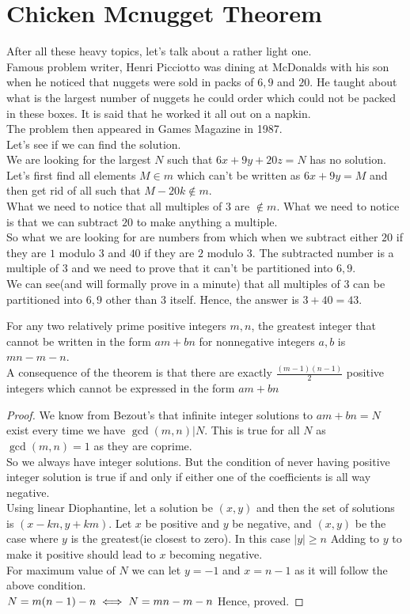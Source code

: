 \section{Chicken Mcnugget Theorem}
After all these heavy topics, let's talk about a rather light one.\\
Famous problem writer, Henri Picciotto was dining at McDonalds with his son when he noticed that nuggets were sold in packs of $6,9$ and $20$. He taught about what is the largest number of nuggets he could order which could not be packed in these boxes. It is said that he worked it all out on a napkin.\\
The problem then appeared in Games Magazine in 1987.\\
Let's see if we can find the solution.\\
We are looking for the largest $N$ such that $6x+9y+20z=N$ has no solution. Let's first find all elements $M \in m$ which can't be written as $6x+9y=M$ and then get rid of all such that $M-20k \notin m$.\\
What we need to notice that all multiples of $3$ are $\notin m$. What we need to notice is that we can subtract $20$ to make anything a multiple.\\
So what we are looking for are numbers from which when we subtract either $20$ if they are $1$ modulo $3$ and $40$ if they are $2$ modulo $3$. The subtracted number is a multiple of $3$ and we need to prove that it can't be partitioned into $6,9$.\\
We can see(and will formally prove in a minute) that all multiples of $3$ can be partitioned into $6,9$ other than $3$ itself. Hence, the answer is $3+40=43$.\\
\begin{theorem}
    For any two relatively prime positive integers $m,n$, the greatest integer that cannot be written in the form $am + bn$ for nonnegative integers $a, b$ is $mn-m-n$. \\
    A consequence of the theorem is that there are exactly $\frac{(m - 1)(n - 1)}{2}$ positive integers which cannot be expressed in the form $am + bn$
\end{theorem}
\begin{proof}
We know from Bezout's that infinite integer solutions to $am+bn=N$ exist every time we have $\gcd(m,n)|N$. This is true for all $N$ as $\gcd(m,n)=1$ as they are coprime.\\
So we always have integer solutions. But the condition of never having positive integer solution is true if and only if either one of the coefficients is all way negative.\\
Using linear Diophantine, let a solution be $(x,y)$ and then the set of solutions is $(x-kn,y+km)$. Let $x$ be positive and $y$ be negative, and $(x,y)$ be the case where $y$ is the greatest(ie closest to zero). In this case $|y|\geq n$ Adding to $y$ to make it positive should lead to $x$ becoming negative.\\
For maximum value of $N$ we can let $y=-1$ and $x=n-1$ as it will follow the above condition.\\
$N=m(n-1)-n\\
\iff N=mn-m-n$
Hence, proved.
\end{proof}
